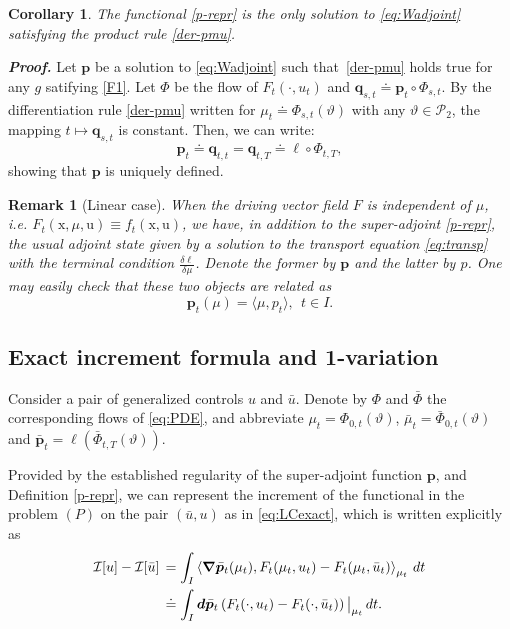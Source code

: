 \documentclass[sn-mathphys-num]{sn-jnl}
\numberwithin{equation}{section}
\theoremstyle{mythm}
\newtheorem{corollary}[proposition]{Corollary}
\theoremstyle{mydef}
\newtheorem{remark}[proposition]{Remark}
\renewenvironment{proof}{\smallskip\noindent\emph{\textbf{Proof.}}%
  \hspace{1pt}}{\hspace{-5pt}{\nobreak\quad\nobreak\hfill\nobreak%
    $\square$\vspace{2pt}\par}\smallskip\goodbreak}
\renewcommand{\d}{\,d}
\renewcommand{\mathbf}[1]{\bm{#1}}
\begin{document}
\begin{corollary}\label{uni_p}
    The functional \eqref{p-repr} is the only solution to \eqref{eq:Wadjoint} satisfying the product rule \eqref{der-pmu}.
\end{corollary}
\begin{proof}
  Let $\bm p$ be a solution to \eqref{eq:Wadjoint} such that~\eqref{der-pmu} holds true for any \( g \) satifying \ref{F1}. Let \( \Phi \) be the flow of \( F_t(\cdot,u_t) \) and $\bm q_{s,t} \doteq \bm p_t\circ \Phi_{s,t}$. By the differentiation rule \eqref{der-pmu} written for \( \mu_t\doteq \Phi_{s,t}(\vartheta) \) with any \( \vartheta\in \mathcal{P}_2 \), the mapping $t\mapsto \bm q_{s,t}$ is constant. Then, we can write:
\[
    \bm p_t \doteq \bm q_{t,t} = \bm q_{t, T} \doteq \ell\circ \Phi_{t, T},
\]
showing that $\bm p$ is uniquely defined.
\end{proof}
\begin{remark}[Linear case]
  When the driving vector field \( F \) is independent of \( \mu \), i.e. \( F_t(\mathrm{x}, \mu, \mathrm{u}) \equiv f_t(\mathrm{x},  \mathrm{u}) \), we have, in addition to the super-adjoint \eqref{p-repr}, the usual adjoint state given by a solution to the transport equation \eqref{eq:transp} with the terminal condition \( \frac{\delta \ell}{\delta \mu} \). Denote the former by \( \bm p \) and the latter by \( p \). One may easily check that these two objects are related as
\[
    \bm p_t(\mu) = \langle\mu, p_t\rangle, \ \ t \in I.
\]
\end{remark}

\subsection{Exact increment formula and 1-variation}

Consider a pair of generalized controls \( u \) and \( \bar{u} \).
Denote by \( \Phi \) and \( \bar{\Phi} \) the corresponding flows of \eqref{eq:PDE}, and abbreviate \( \mu_t = \Phi_{0,t}(\vartheta) \), \( \bar{\mu}_t = \bar{\Phi}_{0,t}(\vartheta) \) and \( \bar{ \mathbf{p}}_t = \ell(\bar{\Phi}_{t,T}(\vartheta)) \).

Provided by the established regularity of the super-adjoint function $\bm p$, and Definition \ref{p-repr}, we can represent the increment of the functional in the problem $(P)$ on the pair $(\bar{u}, {u})$ as in \eqref{eq:LCexact}, which is written explicitly as
\begin{align}
\mathcal{I}[u] - \mathcal{I}[\bar{u}] & \, = \int_I \left< \bm \nabla \bar{\bm{p}} _t(\mu_t),F_t(\mu_t,u_t)-F_t(\mu_t,\bar{u}_{t})\right>_{\mu_t}\d t\notag\\
& \, \doteq \int_I \mathbf{d}\bar{\bm p}_t \left(F_t(\cdot,u_t)-F_t(\cdot,\bar{u}_{t})\right)\big|_{\mu_t}\d t.\label{mf_incr}
\end{align}
\end{document}

